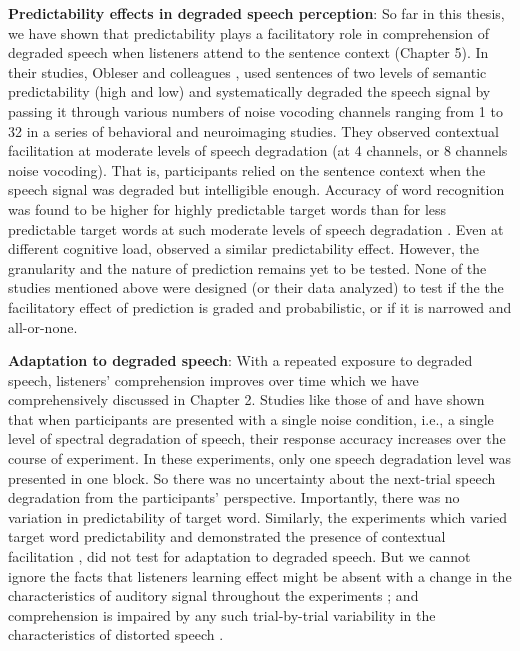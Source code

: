 \documentclass[a4paper, nobind]{templates/ociamthesis}
\begin{document}
\textbf{Predictability effects in degraded speech perception}:
So far in this thesis, we have shown that predictability plays a facilitatory role in comprehension of degraded speech when listeners attend to the sentence context (Chapter 5).
In their studies, Obleser and colleagues \autocite{Obleser2007,Obleser2010,Obleser2011}, used sentences of two levels of semantic predictability (high and low) and systematically degraded the speech signal by passing it through various numbers of noise vocoding channels ranging from 1 to 32 in a series of behavioral and neuroimaging studies.
They observed contextual facilitation at moderate levels of speech degradation (at 4 channels, or 8 channels noise vocoding).
That is, participants relied on the sentence context when the speech signal was degraded but intelligible enough.
Accuracy of word recognition was found to be higher for highly predictable target words than for less predictable target words at such moderate levels of speech degradation \autocite{Obleser2010}.
Even at different cognitive load, \textcite{Hunter2018} observed a similar predictability effect.
However, the granularity and the nature of prediction remains yet to be tested.
None of the studies mentioned above were designed (or their data analyzed) to test if the the facilitatory effect of prediction is graded and probabilistic, or if it is narrowed and all-or-none.

\textbf{Adaptation to degraded speech}:
With a repeated exposure to degraded speech, listeners' comprehension improves over time \autocite{Samuel2009,Guediche2014} which we have comprehensively discussed in Chapter 2.
Studies like those of \textcite{Davis2005} and \textcite{Erb2013} have shown that when participants are presented with a single noise condition, i.e., a single level of spectral degradation of speech, their response accuracy increases over the course of experiment.
In these experiments, only one speech degradation level was presented in one block.
So there was no uncertainty about the next-trial speech degradation from the participants' perspective.
Importantly, there was no variation in predictability of target word.
Similarly, the experiments which varied target word predictability and demonstrated the presence of contextual facilitation \autocites[e.g.,][]{Obleser2007,Sheldon2008a,Sheldon2008b,Obleser2010,Strauss2013,Hunter2018},
did not test for adaptation to degraded speech.
But we cannot ignore the facts that listeners learning effect might be absent with a change in the characteristics of auditory signal throughout the experiments \autocite{Mattys2012};
and comprehension is impaired by any such trial-by-trial variability in the characteristics of distorted speech \autocites{Sommers1994}[see also,][]{Dahan2006}.
\end{document}
